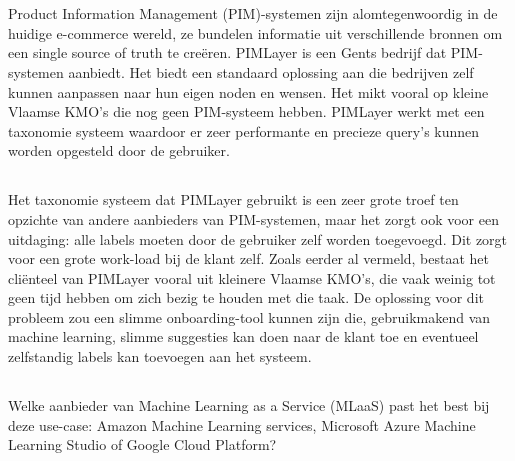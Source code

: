 
\chapter{}%
\label{ch:inleiding}

  Product Information Management (PIM)-systemen zijn alomtegenwoordig in de huidige e-commerce wereld, ze bundelen informatie uit verschillende bronnen om een single source of truth te creëren. PIMLayer is een Gents bedrijf dat PIM-systemen aanbiedt. Het biedt een standaard oplossing aan die bedrijven zelf kunnen aanpassen naar hun eigen noden en wensen. Het mikt vooral op kleine Vlaamse KMO's die nog geen PIM-systeem hebben.  PIMLayer werkt met een taxonomie  systeem waardoor er zeer performante en precieze query’s kunnen worden opgesteld door de gebruiker. 

\section{}%
\label{sec:probleemstelling}

Het taxonomie systeem dat PIMLayer gebruikt is een zeer grote troef ten opzichte van andere aanbieders van PIM-systemen, maar het zorgt ook voor een uitdaging: alle labels moeten door de gebruiker zelf worden toegevoegd. Dit zorgt voor een grote work-load bij de klant zelf. Zoals eerder al vermeld,  bestaat het cliënteel  van PIMLayer vooral uit kleinere Vlaamse KMO's, die vaak weinig tot geen tijd hebben om zich bezig te houden met die taak.  De oplossing voor dit probleem zou een slimme onboarding-tool kunnen zijn die, gebruikmakend van machine learning, slimme suggesties kan doen naar de klant toe en eventueel zelfstandig labels kan toevoegen aan het systeem.

\section{}%
\label{sec:onderzoeksvraag}

Welke aanbieder van Machine Learning as a Service (MLaaS) past het best bij deze use-case: Amazon Machine Learning services, Microsoft Azure Machine Learning Studio of Google Cloud Platform?

